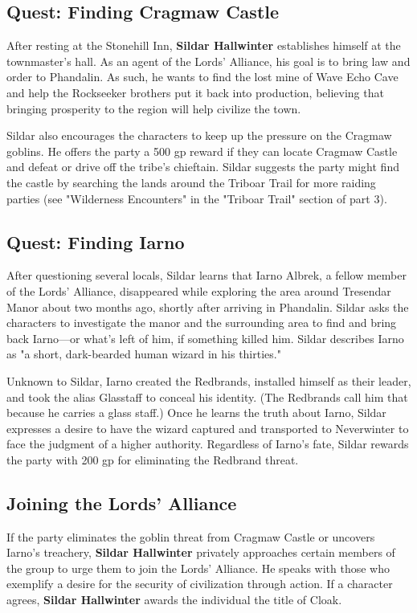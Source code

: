 \documentclass[10pt,a4paper,twoside,bg=print,twocolumn,openany,nodeprecatedcode]{dndbook}
\begin{document}
\subsection{Quest: Finding Cragmaw Castle}
After resting at the Stonehill Inn, \textbf{Sildar Hallwinter} establishes himself at the townmaster's hall. As an agent of the Lords' Alliance, his goal is to bring law and order to Phandalin. As such, he wants to find the lost mine of Wave Echo Cave and help the Rockseeker brothers put it back into production, believing that bringing prosperity to the region will help civilize the town.

Sildar also encourages the characters to keep up the pressure on the Cragmaw goblins. He offers the party a 500 gp reward if they can locate Cragmaw Castle and defeat or drive off the tribe's chieftain. Sildar suggests the party might find the castle by searching the lands around the Triboar Trail for more raiding parties (see "Wilderness Encounters" in the "Triboar Trail" section of part 3).

\subsection{Quest: Finding Iarno}
After questioning several locals, Sildar learns that Iarno Albrek, a fellow member of the Lords' Alliance, disappeared while exploring the area around Tresendar Manor about two months ago, shortly after arriving in Phandalin. Sildar asks the characters to investigate the manor and the surrounding area to find and bring back Iarno—or what's left of him, if something killed him. Sildar describes Iarno as "a short, dark-bearded human wizard in his thirties."

Unknown to Sildar, Iarno created the Redbrands, installed himself as their leader, and took the alias Glasstaff to conceal his identity. (The Redbrands call him that because he carries a glass staff.) Once he learns the truth about Iarno, Sildar expresses a desire to have the wizard captured and transported to Neverwinter to face the judgment of a higher authority. Regardless of Iarno's fate, Sildar rewards the party with 200 gp for eliminating the Redbrand threat.

\subsection{Joining the Lords' Alliance}
If the party eliminates the goblin threat from Cragmaw Castle or uncovers Iarno's treachery, \textbf{Sildar Hallwinter} privately approaches certain members of the group to urge them to join the Lords' Alliance. He speaks with those who exemplify a desire for the security of civilization through action. If a character agrees, \textbf{Sildar Hallwinter} awards the individual the title of Cloak.
\end{document}
